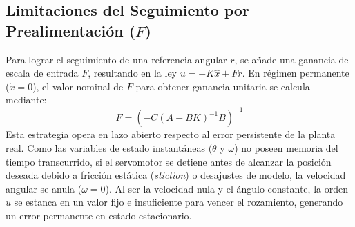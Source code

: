 \documentclass[a4paper, twoside, 10pt, spanish]{article}
\numberwithin{table}{section}
\begin{document}
\subsection{Limitaciones del Seguimiento por Prealimentación ($F$)}
Para lograr el seguimiento de una referencia angular $r$, se añade una ganancia de escala de entrada $F$, resultando en la ley $u = -K \hat{x} + F r$. En régimen permanente ($\dot{x} = 0$), el valor nominal de $F$ para obtener ganancia unitaria se calcula mediante:
\begin{equation}
F = \left( -C (A - B K)^{-1} B \right)^{-1}
\end{equation}
Esta estrategia opera en lazo abierto respecto al error persistente de la planta real. Como las variables de estado instantáneas ($\theta$ y $\omega$) no poseen memoria del tiempo transcurrido, si el servomotor se detiene antes de alcanzar la posición deseada debido a fricción estática (\textit{stiction}) o desajustes de modelo, la velocidad angular se anula ($\omega = 0$). Al ser la velocidad nula y el ángulo constante, la orden $u$ se estanca en un valor fijo e insuficiente para vencer el rozamiento, generando un error permanente en estado estacionario.
\end{document}
